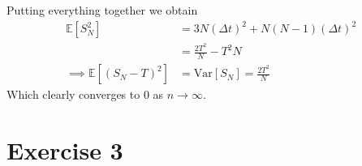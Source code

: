 \documentclass[a4paper,12pt]{article} %
\newcommand{\Var}{\mathrm{Var}}
\begin{document}
Putting everything together we obtain
\begin{align*}
    \mathbb{E} \left[ S_N^2 \right]                             & = 3N (\Delta t)^{2} +N(N-1)(\Delta t)^{2} \\
                                                                & = \frac{2T^2}{N}-T^2{N}                   \\
    \implies \mathbb{E} \left[ \left( S_N  -T\right)^2  \right] & = \Var\left[S_N  \right] = \frac{2T^2}{N}
\end{align*}
Which clearly converges to \(0\) as \(n\to  \infty \).

\section{Exercise 3}
\end{document}

